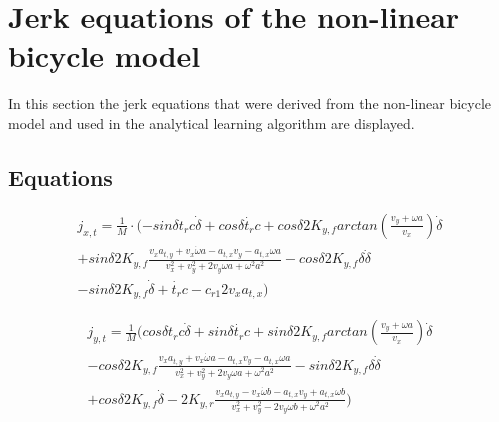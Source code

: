 \chapter{Jerk equations of the non-linear bicycle model}
\label{app:A}

In this section the jerk equations that were derived from the non-linear bicycle model and used in the analytical learning algorithm are displayed.
\section{Equations}

\begin{multline*}
j_{x,t} = \frac{1}{M}\cdot (-sin\delta t_r c \dot{\delta}+ cos \delta\dot{t_r}c 
+ cos\delta 2 K_{y,f}arctan(\frac{v_y+\omega a}{v_x})\dot{\delta}\\ 
+ sin \delta 2 K_{y,f} \frac{v_x a_{t,y} + v_x \dot{\omega}a - a_{t,x}v_y -a_{t,x}\omega a}{v_x^2 +v_y^2 + 2v_y \omega a + \omega ^2 a^2 }
-cos \delta 2 K_{y,f}\delta \dot{\delta}\\
- sin\delta 2 K_{y,f} \dot{\delta} + \dot{t_r}c - c_{r1}2v_x a_{t,x})
\end{multline*}

\begin{multline*}
j_{y,t} = \frac{1}{M}(cos\delta t_r c \dot{\delta} + sin \delta \dot{t_r}c + sin\delta 2 K_{y,f}arctan(\frac{v_y+\omega a}{v_x})\dot{\delta}\\
-cos \delta 2 K_{y,f}\frac{v_x a_{t,y} + v_x \dot{\omega}a - a_{t,x}v_y -a_{t,x}\omega a}{v_x^2 +v_y^2 + 2v_y \omega a + \omega ^2 a^2 } - sin \delta 2 K_{y,f}\delta \dot{\delta}\\
 + cos\delta 2 K_{y,f}\dot{\delta} -2 K_{y,r} \frac{v_x a_{t,y} -v_x \dot{\omega}b - a_{t,x}v_y +a_{t,x}\omega b}{v_x^2 +v_y^2 - 2v_y \omega b + \omega ^2 a^2 })
\end{multline*}



%
%
%
%

